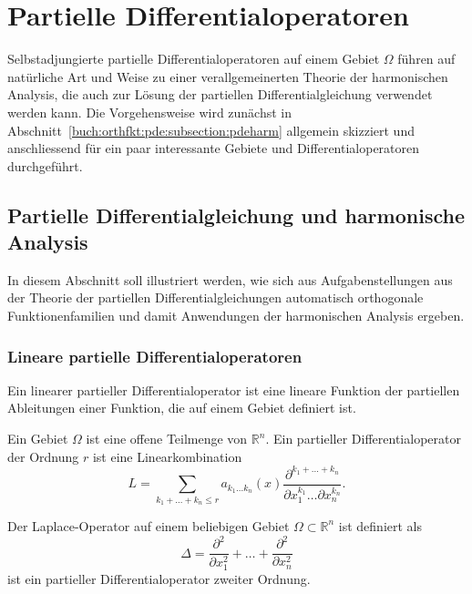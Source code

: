 %
%
%
\section{Partielle Differentialoperatoren
\label{buch:orthofkt:section:pde}}
Selbstadjungierte partielle Differentialoperatoren auf einem Gebiet 
$\Omega$ führen auf natürliche Art und Weise zu einer verallgemeinerten
Theorie der harmonischen Analysis, die auch zur Lösung der
partiellen Differentialgleichung verwendet werden kann.
Die Vorgehensweise wird zunächst in
Abschnitt~\ref{buch:orthfkt:pde:subsection:pdeharm}
allgemein skizziert und anschliessend für ein paar interessante
Gebiete und Differentialoperatoren durchgeführt.

%
%
\subsection{Partielle Differentialgleichung und harmonische Analysis
\label{buch:orthfkt:pde:subsection:pdeharm}}
In diesem Abschnitt soll illustriert werden, wie sich aus Aufgabenstellungen
aus der Theorie der partiellen Differentialgleichungen 
automatisch orthogonale Funktionenfamilien und damit Anwendungen
der harmonischen Analysis ergeben.

%
%
\subsubsection{Lineare partielle Differentialoperatoren}
Ein linearer partieller Differentialoperator ist eine lineare
Funktion der partiellen Ableitungen einer Funktion, die auf einem
Gebiet definiert ist.

\begin{definition}
Ein Gebiet $\Omega$ ist eine offene Teilmenge von $\mathbb{R}^n$.
Ein partieller Differentialoperator der Ordnung $r$ ist eine Linearkombination
\[
L
=
\sum_{k_1+\dots+k_n\le r}
a_{k_1\dots k_n}(x)
\frac{\partial^{k_1+\dots+k_n}}{\partial x_1^{k_1}\dots\partial x_n^{k_n}}.
\]
\end{definition}

\begin{beispiel}
Der Laplace-Operator auf einem beliebigen Gebiet $\Omega\subset\mathbb{R}^n$
ist definiert als
\[
\Delta
=
\frac{\partial^2}{\partial x_1^2}
+
\dots
+
\frac{\partial^2}{\partial x_n^2}
\]
ist ein partieller Differentialoperator zweiter Ordnung.
\end{beispiel}

